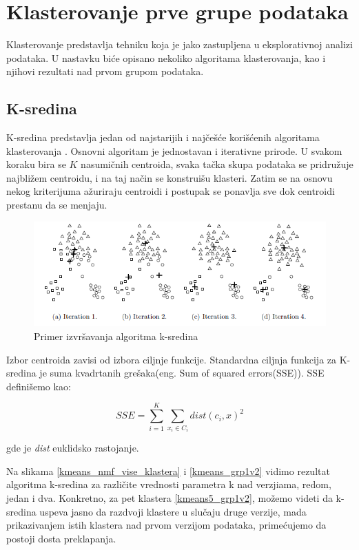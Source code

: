 \documentclass[a4paper]{article}
\begin{document}
\section{Klasterovanje prve grupe podataka}
Klasterovanje predstavlja tehniku koja je jako zastupljena u eksplorativnoj analizi podataka. U nastavku biće opisano nekoliko algoritama klasterovanja, kao i njihovi rezultati nad prvom grupom podataka.



\subsection{K-sredina}
K-sredina predstavlja jedan od najstarijih i najčešće korišćenih algoritama klasterovanja \cite{tan2016introduction}. Osnovni algoritam je jednostavan i iterativne prirode. U svakom koraku bira se $K$ nasumičnih centroida, svaka tačka skupa podataka se pridružuje najbližem centroidu, i na taj način se konstruišu klasteri. Zatim se na osnovu nekog kriterijuma ažuriraju centroidi i postupak se ponavlja sve dok  centroidi prestanu da se menjaju.

\begin{figure}[h!]
\centering
\includegraphics[scale=0.7]{kmeans_primer}
\caption{Primer izvršavanja algoritma k-sredina}
\label{kmeans_primer}
\end{figure}

Izbor centroida zavisi od izbora ciljnje funkcije. Standardna ciljnja funkcija za K-sredina je suma kvadrtanih grešaka(eng. Sum of squared errors(SSE)). SSE definišemo kao:

\begin{equation}
SSE = \sum_{i=1}^K\sum_{x_i \in C_i}dist(c_i, x)^2
\end{equation}

gde je \textit{dist} euklidsko rastojanje.

Na slikama \ref{kmeans_nmf_vise_klastera} i \ref{kmeans_grp1v2} vidimo rezultat algoritma k-sredina za različite vrednosti parametra k nad verzjiama, redom, jedan i dva. Konkretno, za pet klastera \ref{kmeans5_grp1v2}, možemo videti da k-sredina uspeva jasno da razdvoji klastere u slučaju druge verzije, mada prikazivanjem istih klastera nad prvom verzijom podataka, primećujemo da postoji dosta preklapanja. 
\end{document}
